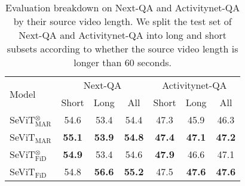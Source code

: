 \documentclass{article}
\newcommand{\frameworkname}{SeViT}
\begin{document}
\begin{table}[t!]
    \label{table:comparing_selection_method}
\end{table} \begin{table}[t!]
    \centering
    \small
    \caption{Evaluation breakdown on Next-QA and Activitynet-QA by their source video length. We split the test set of Next-QA and Activitynet-QA into long and short subsets according to whether the source video length is longer than 60 seconds.}
    \vskip 0.15in
\begin{tabular}{lcccccc}
        \toprule
        \multirow{2}[3]{*}{Model} & \multicolumn{3}{c}{Next-QA} & \multicolumn{3}{c}{Activitynet-QA} \\
        \cmidrule(r){2-4}
        \cmidrule(r){5-7}
        & Short & Long & All & Short & Long & All \\
        \midrule
        \frameworkname{}$_\text{MAR}^{\otimes}$ & 54.6 & 53.4 & 54.4 & 47.3 & 45.9 & 46.3 \\
        \frameworkname{}$_\text{MAR}$ & \textbf{55.1} & \textbf{53.9} & \textbf{54.8} & \textbf{47.4} & \textbf{47.1} & \textbf{47.2} \\
        \midrule
        \frameworkname{}$_\text{FiD}^{\otimes}$ & \textbf{54.9} & 53.4 & 54.6 & \textbf{47.9} & 46.6 & 47.1 \\
        \frameworkname{}$_\text{FiD}$ & 54.8 & \textbf{56.6} & \textbf{55.2} & 47.5 & \textbf{47.6} & \textbf{47.6} \\
        \bottomrule
    \end{tabular}



\end{table}
\end{document}

